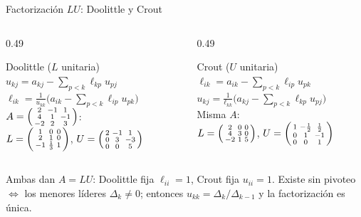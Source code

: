 \documentclass[aspectratio=169,10pt]{beamer}
\begin{document}
\begin{frame}{Factorización $LU$: Doolittle y Crout}
\begin{columns}[T]
\begin{column}{0.49\textwidth}
\begin{cardidea}{Doolittle ($L$ unitaria)}{\faSuperscript}
{\footnotesize $u_{kj}=a_{kj}-\!\sum_{p<k}\ell_{kp}u_{pj}$\\[0.8mm]
$\ell_{ik}=\tfrac{1}{u_{kk}}\big(a_{ik}-\!\sum_{p<k}\ell_{ip}u_{pk}\big)$\\[1.6mm]
$A=\begin{psmallmatrix}2&-1&1\\4&1&-1\\-2&2&3\end{psmallmatrix}$:\\[1.2mm]
$L=\begin{psmallmatrix}1&0&0\\2&1&0\\-1&\frac13&1\end{psmallmatrix}$, $U=\begin{psmallmatrix}2&-1&1\\0&3&-3\\0&0&5\end{psmallmatrix}$}
\end{cardidea}
\end{column}
\begin{column}{0.49\textwidth}
\begin{cardgear}{Crout ($U$ unitaria)}{\faSuperscript}
{\footnotesize $\ell_{ik}=a_{ik}-\!\sum_{p<k}\ell_{ip}u_{pk}$\\[0.8mm]
$u_{kj}=\tfrac{1}{\ell_{kk}}\big(a_{kj}-\!\sum_{p<k}\ell_{kp}u_{pj}\big)$\\[1.6mm]
Misma $A$:\\[1.2mm]
$L=\begin{psmallmatrix}2&0&0\\4&3&0\\-2&1&5\end{psmallmatrix}$, $U=\begin{psmallmatrix}1&-\frac12&\frac12\\0&1&-1\\0&0&1\end{psmallmatrix}$}
\end{cardgear}
\end{column}
\end{columns}
\vspace{1mm}
\begin{cardnota}[\faInfoCircle]
{\footnotesize Ambas dan $A=LU$: Doolittle fija $\ell_{ii}=1$, Crout fija $u_{ii}=1$. Existe sin pivoteo $\iff$ los menores líderes $\Delta_k\neq0$; entonces $u_{kk}=\Delta_k/\Delta_{k-1}$ y la factorización es única.}
\end{cardnota}
\end{frame}
\end{document}
